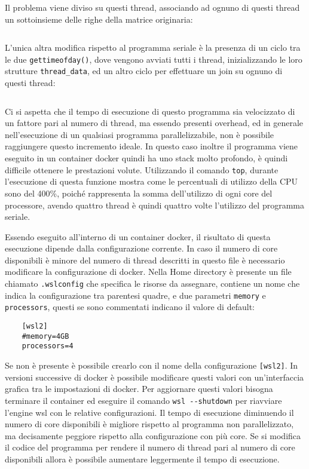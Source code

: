 \documentclass{article}
\numberwithin{equation}{subsection}
\begin{document}
Il problema viene diviso su questi thread, associando ad ognuno di questi thread un 
sottoinsieme delle righe della matrice originaria: 
\inputminted[firstline=42, lastline=44]{c}{./"Programmazione Concorrente"/multi.c}

L'unica altra modifica rispetto al programma seriale è la presenza di un ciclo 
tra le due \verb|gettimeofday()|, dove vengono avviati tutti i thread, inizializzando 
le loro strutture \verb|thread_data|, ed un altro ciclo per effettuare un join su 
ognuno di questi thread:
\inputminted[firstline=50, lastline=63]{c}{./"Programmazione Concorrente"/multi.c}



Ci si aspetta che il tempo di esecuzione 
di questo programma sia velocizzato di un fattore pari al numero di thread, ma essendo presenti overhead, ed in generale nell'esecuzione di 
un qualsiasi programma parallelizzabile, non è possibile raggiungere questo incremento ideale. 
In questo caso inoltre il programma viene eseguito in un container docker quindi ha uno stack molto profondo, è quindi difficile ottenere le prestazioni volute. Utilizzando il comando \verb|top|, durante l'esecuzione di questa funzione mostra come le percentuali di utilizzo della CPU 
sono del 400\%, poiché rappresenta la somma dell'utilizzo di ogni core del processore, avendo 
quattro thread è quindi quattro volte l'utilizzo del programma seriale. 


Essendo eseguito all'interno di un container docker, il risultato di questa esecuzione dipende dalla configurazione corrente. In caso il numero di core disponibili è minore del numero di thread descritti in questo file è necessario modificare la configurazione di docker. 
Nella Home directory è presente un file chiamato \verb|.wslconfig| che specifica le risorse da assegnare, contiene un nome che indica la configurazione tra 
parentesi quadre, e due parametri \verb|memory| e \verb|processors|, questi se sono commentati indicano il valore di default:
\begin{verbatim}
    [wsl2]
    #memory=4GB
    processors=4
\end{verbatim}
Se non è presente è possibile 
crearlo con il nome della configurazione \verb|[wsl2]|. In versioni successive di docker è possibile modificare questi valori con un'interfaccia grafica 
tra le impostazioni di docker. 
Per aggiornare questi valori bisogna terminare il container ed eseguire il comando \verb|wsl --shutdown| per riavviare l'engine wsl con le relative configurazioni. 
Il tempo di esecuzione diminuendo il numero di core disponibili è migliore rispetto al programma non parallelizzato, ma decisamente peggiore rispetto alla configurazione 
con più core. Se si modifica il codice del programma per rendere il numero di thread pari al numero di core disponibili allora è possibile aumentare leggermente il 
tempo di esecuzione. 
\end{document}
